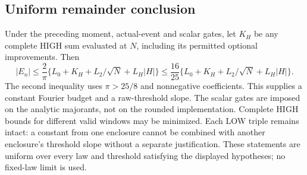 \subsection{Uniform remainder conclusion}

Under the preceding moment, actual-event and scalar gates, let $K_H$ be
any complete HIGH sum evaluated at $N$, including its permitted optional
improvements. Then
\begin{equation}\label{j:fourier:conclusion}
 |E_n|\le\frac2\pi\{L_0+K_H+L_2/\sqrt N+L_H|H|\}
 \le\frac{16}{25}\{L_0+K_H+L_2/\sqrt N+L_H|H|\}.
\end{equation}
The second inequality uses $\pi>25/8$ and nonnegative coefficients.
This supplies a constant Fourier budget and a raw-threshold slope.
The scalar gates are imposed on the analytic majorants, not on the rounded
implementation. Complete HIGH bounds for different valid windows may be
minimized. Each LOW triple remains intact: a constant from one enclosure
cannot be combined with another enclosure's threshold slope without a
separate justification. These statements are uniform over every law and
threshold satisfying the displayed hypotheses; no fixed-law limit is used.
